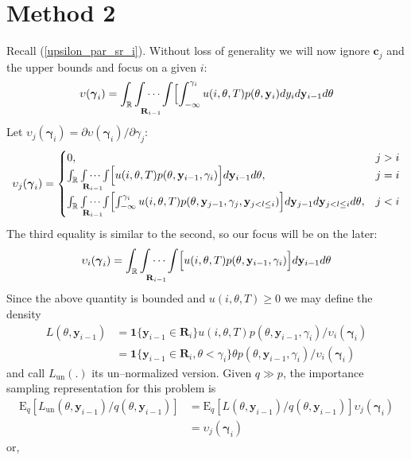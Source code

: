 \documentclass[11pt]{article}
\begin{document}
\section{Method 2}
Recall (\ref{upsilon_par_sr_i}). Without loss of generality we will
now ignore $\mathbf{c}_j$ and the upper bounds and focus on a given
$i$:
\begin{equation}
\upsilon(\boldsymbol{\gamma}_i)=\int_{\mathbb{R}}\idotsint\limits_{\mathbf{R}_{i-1}}\Bigl[\int_{-\infty}^{\gamma_i}u(i,\theta,T)p(\theta,\mathbf{y}_{i})
d y_i d \mathbf{y}_{i-1}  d \theta
\end{equation}
Let
$\upsilon_j(\boldsymbol{\gamma}_i)=\partial\upsilon(\boldsymbol{\gamma}_i)/\partial{\gamma_j}
$:
\begin{equation}
\upsilon_j(\boldsymbol{\gamma}_i)=\begin{cases}
0, & j>i \\
\int_{\mathbb{R}} \idotsint\limits_{\mathbf{R}_{i-1}}\Bigl[
u(i,\theta,T)p(\theta,\mathbf{y}_{i-1},\gamma_i) \Bigr]
d \mathbf{y}_{i-1}  d \theta , & j=i\\
\int_{\mathbb{R}} \idotsint\limits_{\mathbf{R}_{i-1}}\Bigl[
\int_{-\infty}^{\gamma_i}
u(i,\theta,T)p(\theta,\mathbf{y}_{j-1},\gamma_j,\mathbf{y}_{j<l\leq
i})\Bigr] d \mathbf{y}_{j-1}d \mathbf{y}_{j<l\leq i}  d \theta, &j<i
\end{cases}
\end{equation}
The third equality is similar to the second, so our focus will be on
the later:
\begin{align}
\upsilon_i(\boldsymbol{\gamma}_i)= \int_{\mathbb{R}}
\idotsint\limits_{\mathbf{R}_{i-1}}\Bigl[
u(i,\theta,T)p(\theta,\mathbf{y}_{i-1},\gamma_i) \Bigr] d
\mathbf{y}_{i-1}  d \theta
\end{align}Since the above quantity is bounded and $u(i,\theta,T)\geq 0$ we may
define the density
\begin{align}
L(\theta,\mathbf{y}_{i-1})&=\boldsymbol{1}\{\mathbf{y}_{i-1}\in
\mathbf{R}_i\}u(i,\theta,T)p(\theta,\mathbf{y}_{i-1},\gamma_i)/\upsilon_i(\boldsymbol{\gamma}_i)\\
&=\boldsymbol{1}\{\mathbf{y}_{i-1}\in \mathbf{R}_i,
\theta<\gamma_i\}\theta
p(\theta,\mathbf{y}_{i-1},\gamma_i)/\upsilon_i(\boldsymbol{\gamma}_i)
\end{align}
and call $L_{\mathrm{un}}(.)$ its un--normalized version.
Given
$q\gg p$, the importance sampling representation for this problem
is\begin{align}
\mathrm{E}_q[L_{\mathrm{un}}(\theta,\mathbf{y}_{i-1})/q(\theta,\mathbf{y}_{i-1})]
&=
\mathrm{E}_q[L(\theta,\mathbf{y}_{i-1})/q(\theta,\mathbf{y}_{i-1})]\upsilon_j(\boldsymbol{\gamma}_i)\\
&=\upsilon_j(\boldsymbol{\gamma}_i)
\end{align}or,
\end{document}
